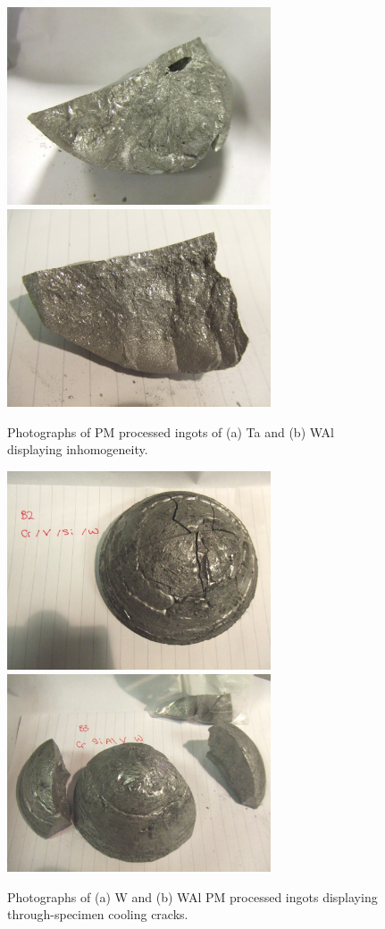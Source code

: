 \begin{figure}[H]
\begin{center}
\includegraphics[width=7.8cm]{PMsanTaii}
\includegraphics[width=7.8cm]{PMsanWAlii}
\caption{Photographs of PM processed ingots of (a) Ta and (b) WAl displaying inhomogeneity.}
\label{fig:pmsantaii}
\end{center}
\end{figure}
%
%
\begin{figure}[H]
\begin{center}
\includegraphics[width=7.8cm]{PMsanW}
\includegraphics[width=7.8cm]{PMsanWAl}
\caption{Photographs of (a) W and (b) WAl PM processed ingots displaying through-specimen cooling cracks.}
\label{fig:pmsanw}
\end{center}
\end{figure}
